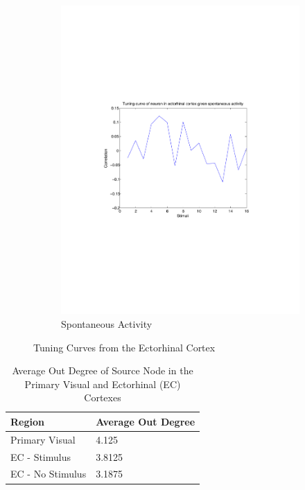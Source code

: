 \documentclass{article}
\begin{document}
\begin{figure}[ht]
\begin{subfigure}{0.45\textwidth}
    \includegraphics[width=\textwidth]{ECNeuronTuningCurve_Spont}
    \caption{Spontaneous Activity}
    \label{fig:spont_tuning}
  \end{subfigure}

  \caption{Tuning Curves from the Ectorhinal Cortex}
  \label{fig:ecto_tuning_curves}
\end{figure}

\begin{table}
  \centering

  \begin{tabular}{l|l}
    \hline
    Region           & Average Out Degree \\
    \hline
    Primary Visual   & 4.125              \\
    \hline 
    EC - Stimulus    & 3.8125             \\
    \hline
    EC - No Stimulus & 3.1875             \\ 
    \hline
  \end{tabular}

  \caption{Average Out Degree of Source Node in the Primary Visual and Ectorhinal (EC) Cortexes}
  \label{tab:degrees}
\end{table}
\end{document}
